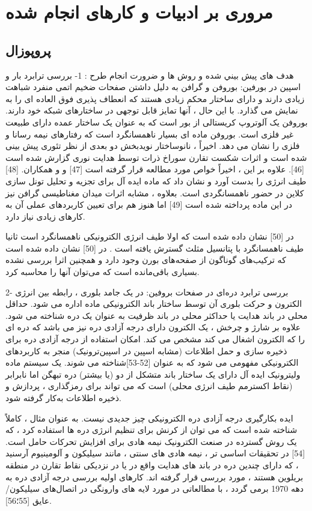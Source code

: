 \chapter{مروری بر ادبیات و کار‌های انجام شده}
\clearpage
\section{پروپوزال}
هدف های پيش بيني شده و روش ها و ضرورت انجام طرح :
1-	بررسی ترابرد بار و اسپین در بورفین:
بوروفن و گرافن به دلیل داشتن صفحات ضخیم اتمی منفرد شباهت زیادی دارند و دارای ساختار محکم زیادی هستند که انعطاف پذیری فوق العاده ای را به نمایش می گذارد. با این حال ، آنها تمایز قابل توجهی در ساختارهای شبکه خود دارند. بوروفن یک آلوتروپ کریستالی از بور است که به عنوان یک ساختار عمده دارای طبیعت غیر فلزی است. بوروفن ماده ای بسیار ناهمسانگرد است که رفتارهای نیمه رسانا و فلزی را نشان می دهد. اخیراً ، نانوساختار نویدبخش دو بعدی از نظر تئوری پیش بینی شده است و اثرات شکست تقارن سوراخ ذرات توسط هدایت نوری گزارش شده است [46]. علاوه بر این ، اخیراً خواص  مورد مطالعه قرار گرفته است [47] و  و همکاران. [48] طیف انرژی را بدست آورد و نشان داد که ماده ایده آل برای تجزیه و تحلیل تونل سازی کلاین در حضور ناهمسانگردی است. بعلاوه ، مشابه اثرات میدان مغناطیسی گرافن نیز در این ماده پرداخته شده است [49] اما هنوز هم برای تعیین کاربردهای عملی آن به کارهای زیادی نیاز دارد.

در [50] نشان داده شده است که اولا طیف انرژی الکترونیکی ناهمسانگرد است ثانیا طیف ناهمسانگرد با پتانسیل مثلث گسترش یافته است .
در [50] نشان داده شده‌ است که  ترکیب‌های گوناگون از صفحه‌های بورن وجود دارد و همچنین اثرا بررسی نشده بسیاری باقی‌مانده است که می‌توان آنها را محاسبه کرد.

2-	بررسی ترابرد دره‌ای در صفحات بروفین:
در یک جامد بلوری ، رابطه بین انرژی الکترون و حرکت بلوری آن توسط ساختار باند الکترونیکی ماده اداره می شود. حداقل محلی در باند هدایت یا حداکثر محلی در باند ظرفیت به عنوان یک دره شناخته می شود. علاوه بر شارژ و چرخش ، یک الکترون دارای درجه آزادی دره نیز می باشد که دره ای را که الکترون اشغال می کند مشخص می کند. امکان استفاده از درجه آزادی دره برای ذخیره سازی و حمل اطلاعات (مشابه اسپین در اسپین‌ترونیک) منجر به کاربردهای الکترونیکی مفهومی می شود که به عنوان  [52-53]شناخته می شوند. یک سیستم ماده ولیترونیک ایده آل دارای یک ساختار باند متشکل از دو (یا بیشتر) دره تبهگن اما نابرابر (نقاط اکسترمم طیف انرژی محلی) است که می تواند برای رمزگذاری ، پردازش و ذخیره اطلاعات به‌کار گرفته شود.

ایده بکارگیری درجه آزادی دره الکترونیکی چیز جدیدی نیست. به عنوان مثال ، کاملاً شناخته شده است که می توان از کرنش برای تنظیم انرژی دره ها استفاده کرد ، که یک روش گسترده در صنعت الکترونیک نیمه هادی برای افزایش تحرکات حامل است.[54] در تحقیقات اساسی تر ، نیمه هادی های سنتی ، مانند سیلیکون و آلومینیوم آرسنید  ، که دارای چندین دره در باند های هدایت واقع در یا در نزدیکی نقاط تقارن  در منطقه بریلوین هستند ، مورد بررسی قرار گرفته اند. کارهای اولیه بررسی درجه آزادی دره به دهه 1970 برمی گردد ، با مطالعاتی در مورد لایه های وارونگی در اتصال‌های سیلیکون/عایق [55؛56].


